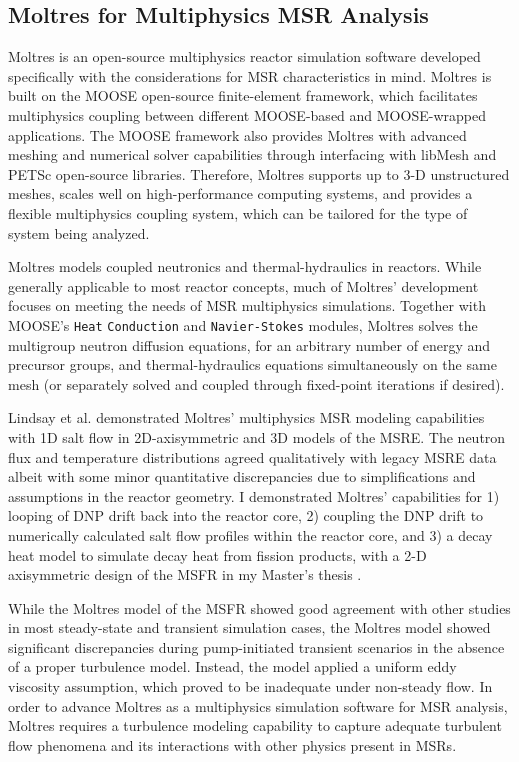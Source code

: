 \subsection{Moltres for Multiphysics \gls{MSR} Analysis}

Moltres \cite{lindsay_moltres_2017} is an open-source multiphysics reactor simulation software
developed specifically with the considerations for \gls{MSR} characteristics in mind. Moltres is
built on the \gls{MOOSE} \cite{permann_moose_2020} open-source finite-element framework,
which facilitates multiphysics coupling between different
\gls{MOOSE}-based and \gls{MOOSE}-wrapped applications. The \gls{MOOSE} framework also provides
Moltres with advanced meshing and numerical solver capabilities through interfacing with libMesh
\cite{kirk_libmesh_2006} and PETSc \cite{satish_petsc_2019} open-source libraries. Therefore,
Moltres supports up to 3-D unstructured meshes, scales well on high-performance computing systems,
and provides a flexible multiphysics coupling system, which can be tailored for the type of
system being analyzed.

Moltres models coupled neutronics and thermal-hydraulics in reactors. While
generally applicable to most reactor concepts, much of
Moltres' development focuses on meeting the needs of \gls{MSR} multiphysics simulations.
Together with \gls{MOOSE}'s \texttt{Heat}
\texttt{Conduction} and \texttt{Navier-Stokes} \cite{peterson_overview_2018}
modules, Moltres solves the multigroup neutron diffusion
equations, for an arbitrary number of energy and precursor groups, and
thermal-hydraulics equations simultaneously on the same mesh (or separately solved and coupled
through fixed-point iterations if desired).

Lindsay et al. \cite{lindsay_introduction_2018}
demonstrated Moltres' multiphysics \gls{MSR} modeling capabilities with 1D salt
flow in 2D-axisymmetric and 3D models of the \gls{MSRE}. The neutron flux and
temperature distributions agreed qualitatively with legacy
\gls{MSRE} data albeit with some minor quantitative discrepancies due to
simplifications and assumptions in the reactor geometry. I demonstrated Moltres' capabilities for
1) looping of \gls{DNP} drift back into the reactor core, 2) coupling the \gls{DNP}
drift to numerically calculated salt flow profiles within the reactor core,
and 3) a decay heat model to simulate decay heat from fission products, with a 2-D axisymmetric
design of the \gls{MSFR} in my Master's thesis \cite{park_advancement_2020}.

While the Moltres
model of the \gls{MSFR} showed good agreement with other studies in most steady-state and transient
simulation cases, the Moltres model showed significant discrepancies during pump-initiated
transient scenarios in the absence of a proper turbulence model. Instead, the model applied a
uniform eddy viscosity assumption, which proved to be inadequate under non-steady flow. In order to
advance Moltres as a multiphysics simulation software for \gls{MSR} analysis, Moltres requires a
turbulence modeling capability to capture adequate turbulent flow phenomena and its interactions
with other physics present in \glspl{MSR}.


